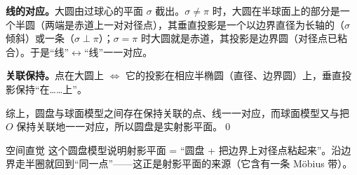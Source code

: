 \textbf{线的对应。}大圆由过球心的平面 $\sigma$ 截出。$\sigma\neq\pi$ 时，大圆在半球面上的部分是一个半圆（两端是赤道上一对对径点），其垂直投影是一个以边界直径为长轴的（$\sigma$ 倾斜）或一条（$\sigma\perp\pi$）；$\sigma=\pi$ 时大圆就是赤道，其投影是边界圆（对径点已粘合）。于是“线”$\leftrightarrow$“线”一一对应。

\textbf{关联保持。}点在大圆上 $\iff$ 它的投影在相应半椭圆（直径、边界圆）上，垂直投影保持“在……上”。

综上，圆盘与球面模型之间存在保持关联的点、线一一对应，而球面模型又与把 $O$ 保持关联地一一对应，所以圆盘是实射影平面。\qed

\begin{intbox}{空间直觉}
这个圆盘模型说明射影平面 = “圆盘 + 把边界上对径点粘起来”。沿边界走半圈就回到“同一点”——这正是射影平面的来源（它含有一条 Möbius 带）。
\end{intbox}
